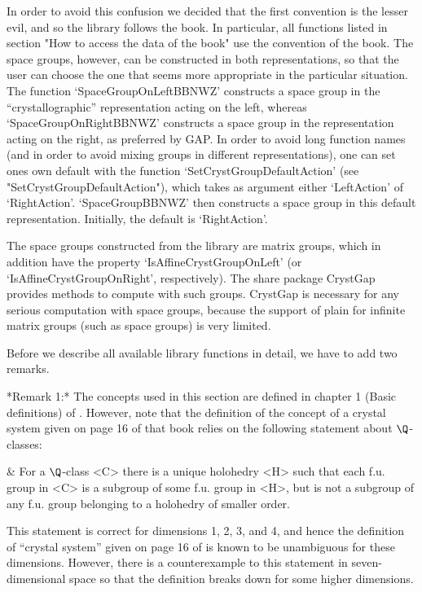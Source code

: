 In order to avoid this confusion we decided that the first convention
is the lesser evil, and so the {\GAP} library follows the book. In
particular, all functions listed in section "How to access the data 
of the book" use the convention of the book. The space groups, however,
can be constructed in both representations, so that the user can choose
the one that seems more appropriate in the particular situation.
The function `SpaceGroupOnLeftBBNWZ' constructs a space group in
the ``crystallographic'' representation acting on the left,
whereas `SpaceGroupOnRightBBNWZ' constructs a space group in the
representation acting on the right, as preferred by GAP. In order to 
avoid long function names (and in order to avoid mixing groups in
different representations), one can set ones own default with the 
function `SetCrystGroupDefaultAction' (see "SetCrystGroupDefaultAction"), 
which takes as argument either `LeftAction' of `RightAction'. 
`SpaceGroupBBNWZ' then constructs a space group in this default
representation. Initially, the default is `RightAction'.

The space groups constructed from the library are matrix groups, which
in addition have the property `IsAffineCrystGroupOnLeft' (or
`IsAffineCrystGroupOnRight', respectively). The share package CrystGap
provides methods to compute with such groups. CrystGap is necessary
for any serious computation with space groups, because the support of
plain {\GAP} for infinite matrix groups (such as space groups) is very
limited.

Before we describe all available library functions in detail, we have
to add two remarks.

*Remark 1:*
The concepts  used  in  this section are   defined  in chapter 1   (Basic
definitions) of \cite{BBNWZ78}.  However, note that the definition of the
concept of a crystal system given on page  16 of that  book relies on the
following statement about $\Q$-classes:

\beginitems
& For a  $\Q$-class  <C>  there is a unique holohedry <H> such that
  each  f.u. group in <C>  is a subgroup of some  f.u. group in
  <H>,  but is not  a subgroup of any  f.u. group  belonging to a
  holohedry of smaller order.
\enditems

This  statement is correct for  dimensions 1, 2,  3, and 4, and hence the
definition of ``crystal system'' given on page 16 of \cite{BBNWZ78} is
known  to   be unambiguous for   these  dimensions.  However, there  is a
counterexample to  this statement in seven-dimensional  space so that the
definition breaks down for some higher dimensions.

